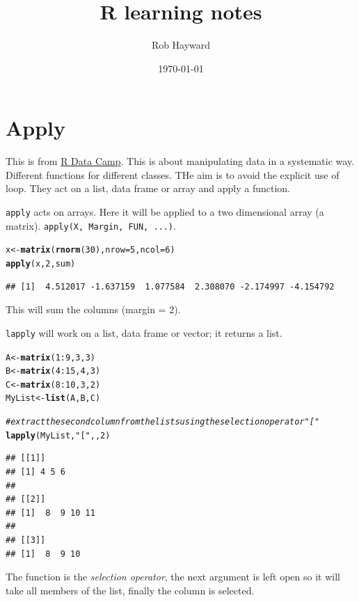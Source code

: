 \documentclass[12pt, a4paper, oneside]{article}\usepackage[]{graphicx}\usepackage[]{color}
\makeatletter
\newcommand{\hlnum}[1]{\textcolor[rgb]{0.686,0.059,0.569}{#1}}%
\newcommand{\hlstr}[1]{\textcolor[rgb]{0.192,0.494,0.8}{#1}}%
\newcommand{\hlcom}[1]{\textcolor[rgb]{0.678,0.584,0.686}{\textit{#1}}}%
\newcommand{\hlopt}[1]{\textcolor[rgb]{0,0,0}{#1}}%
\newcommand{\hlstd}[1]{\textcolor[rgb]{0.345,0.345,0.345}{#1}}%
\newcommand{\hlkwb}[1]{\textcolor[rgb]{0.69,0.353,0.396}{#1}}%
\newcommand{\hlkwc}[1]{\textcolor[rgb]{0.333,0.667,0.333}{#1}}%
\newcommand{\hlkwd}[1]{\textcolor[rgb]{0.737,0.353,0.396}{\textbf{#1}}}%
\newenvironment{kframe}{%
 \def\at@end@of@kframe{}%
 \ifinner\ifhmode%
  \def\at@end@of@kframe{\end{minipage}}%
  \begin{minipage}{\columnwidth}%
 \fi\fi%
 \def\FrameCommand##1{\hskip\@totalleftmargin \hskip-\fboxsep
 \colorbox{shadecolor}{##1}\hskip-\fboxsep
     \hskip-\linewidth \hskip-\@totalleftmargin \hskip\columnwidth}%
 \MakeFramed {\advance\hsize-\width
   \@totalleftmargin\z@ \linewidth\hsize
   \@setminipage}}%
 {\par\unskip\endMakeFramed%
 \at@end@of@kframe}
\newenvironment{knitrout}{}{} %
\makeatother
\begin{document}
\title{R learning notes}
\author{Rob Hayward}
\date{\today}
\maketitle
\section{Apply}
This is from \href{http://blog.datacamp.com/r-tutorial-apply-family/}{R Data Camp}.  This is about manipulating data in a systematic way.  Different functions for different classes. THe aim is to avoid the explicit use of loop. They act on a list, data frame or array and apply a function.  

\lstinline{apply} acts on arrays.  Here it will be applied to a two dimensional array (a matrix). \lstinline{apply(X, Margin, FUN, ...)}. 
\begin{knitrout}
\color{fgcolor}\begin{kframe}
\begin{alltt}
\hlstd{x} \hlkwb{<-} \hlkwd{matrix}\hlstd{(}\hlkwd{rnorm}\hlstd{(}\hlnum{30}\hlstd{),} \hlkwc{nrow} \hlstd{=} \hlnum{5}\hlstd{,} \hlkwc{ncol} \hlstd{=} \hlnum{6}\hlstd{)}
\hlkwd{apply}\hlstd{(x,} \hlnum{2}\hlstd{, sum)}
\end{alltt}
\begin{verbatim}
## [1]  4.512017 -1.637159  1.077584  2.308070 -2.174997 -4.154792
\end{verbatim}
\end{kframe}
\end{knitrout}
This will sum the columns (margin = 2).  

\lstinline{lapply} will work on a list, data frame or vector; it returns a list. 

\begin{knitrout}
\color{fgcolor}\begin{kframe}
\begin{alltt}
\hlstd{A} \hlkwb{<-} \hlkwd{matrix}\hlstd{(}\hlnum{1}\hlopt{:}\hlnum{9}\hlstd{,} \hlnum{3}\hlstd{,} \hlnum{3}\hlstd{)}
\hlstd{B} \hlkwb{<-} \hlkwd{matrix}\hlstd{(}\hlnum{4}\hlopt{:}\hlnum{15}\hlstd{,} \hlnum{4}\hlstd{,} \hlnum{3}\hlstd{)}
\hlstd{C} \hlkwb{<-} \hlkwd{matrix}\hlstd{(}\hlnum{8}\hlopt{:}\hlnum{10}\hlstd{,} \hlnum{3}\hlstd{,} \hlnum{2}\hlstd{)}
\hlstd{MyList} \hlkwb{<-} \hlkwd{list}\hlstd{(A, B, C)}

\hlcom{# extract the second column from the lists using  the selection operator "["}
\hlkwd{lapply}\hlstd{(MyList,} \hlstr{"["}\hlstd{, ,} \hlnum{2}\hlstd{)}
\end{alltt}
\begin{verbatim}
## [[1]]
## [1] 4 5 6
## 
## [[2]]
## [1]  8  9 10 11
## 
## [[3]]
## [1]  8  9 10
\end{verbatim}
\end{kframe}
\end{knitrout}
The function is the \emph{selection operator}, the next argument is left open so it will take all members of the list, finally the column is selected. 
\end{document}
